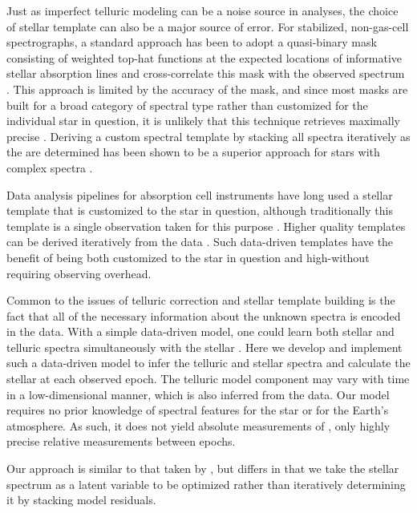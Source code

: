 \documentclass[twocolumn]{aastex62}
\begin{document}
Just as imperfect telluric modeling can be a noise source in \EPRV analyses, the choice of stellar template can also be a major source of error. 
For stabilized, non-gas-cell \RV spectrographs, a standard approach has been to adopt a quasi-binary mask consisting of weighted top-hat functions at the expected locations of informative stellar absorption lines and cross-correlate this mask with the observed spectrum \citep[e.g.][]{Baranne1979, Pepe2002}. 
This approach is limited by the accuracy of the mask, and since most masks are built for a broad category of spectral type rather than customized for the individual star in question, it is unlikely that this technique retrieves maximally precise \RVs. 
Deriving a custom spectral template by stacking all spectra iteratively as the \RVs are determined has been shown to be a superior approach for stars with complex spectra \citep{AngladaEscude2012, Zechmeister2018}. 

Data analysis pipelines for absorption cell instruments have long used a stellar template that is customized to the star in question, although traditionally this template is  a single observation taken for this purpose \citep[e.g.][]{Butler1996}. 
Higher quality templates can be derived iteratively from the data \citep{Sato2002, Gao2016}. 
Such data-driven templates have the benefit of being both customized to the star in question and high-\SNR without requiring observing overhead. 

Common to the issues of telluric correction and stellar template building is the fact that all of the necessary information about the unknown spectra is encoded in the data. 
With a simple data-driven model, one could learn both stellar and telluric spectra simultaneously with the stellar \RVs. 
Here we develop and implement such a data-driven model to infer the telluric and stellar spectra and calculate the stellar \RV at each observed epoch. 
The telluric model component may vary with time in a low-dimensional manner, which is also inferred from the data. 
Our model requires no prior knowledge of spectral features for the star or for the Earth's atmosphere. 
As such, it does not yield absolute measurements of \RVs, only highly precise relative measurements between epochs. 

Our approach  is similar to that taken by \citet{Gao2016}, but differs in that we take the stellar spectrum as a latent variable to be optimized rather than iteratively determining it by stacking model residuals. 
\end{document}
